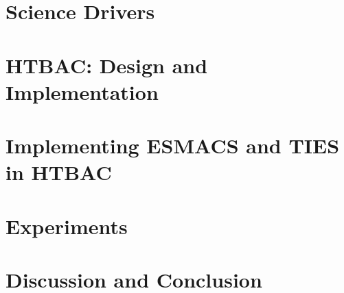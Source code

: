 \documentclass[conference]{IEEEtran}
\begin{document}
\section{Science Drivers}
\label{sec:science-drivers}




\section{HTBAC: Design and Implementation}
\label{sec:htbac}



\section{Implementing ESMACS and TIES in HTBAC}
\label{sec:implementation_htbac}



\section{Experiments}
\label{sec:experiments}



\section{Discussion and Conclusion}
\label{sec:discussion}


\newpage



\end{document}
